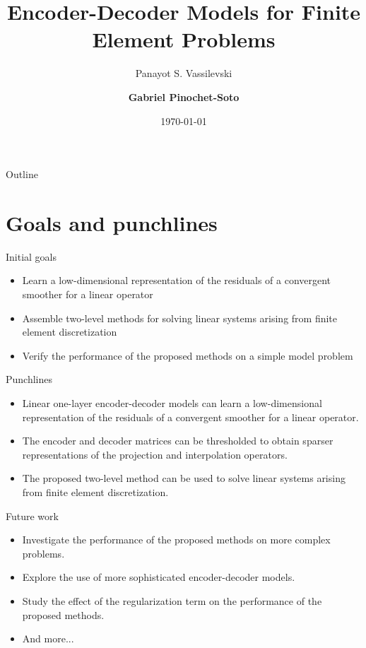 \documentclass{beamer}
\title[EDNN for FEM]{Encoder-Decoder Models for Finite Element Problems}
\author[P. S. Vassilevski, G. Pinochet-Soto]{%
    Panayot S. Vassilevski\inst{1} \and
    \textbf{Gabriel Pinochet-Soto}\inst{1}
}
\institute[PSU]{
    \inst{1} Portland State University
}
\date{\today}
\begin{document}
\begin{frame}
\titlepage
\end{frame}

\begin{frame}{Outline}
\tableofcontents
\end{frame}

\section{Goals and punchlines}
\begin{frame}{Initial goals}
\begin{itemize}
    \item Learn a low-dimensional representation of the residuals of a convergent smoother for a linear operator
    \item Assemble two-level methods for solving linear systems arising from finite element discretization
    \item Verify the performance of the proposed methods on a simple model problem
\end{itemize}
\end{frame}

\begin{frame}{Punchlines}
\begin{itemize}
    \item Linear one-layer encoder-decoder models can learn a low-dimensional representation of the residuals of a convergent smoother for a linear operator.
    \item The encoder and decoder matrices can be thresholded to obtain sparser representations of the projection and interpolation operators.
    \item The proposed two-level method can be used to solve linear systems arising from finite element discretization.
\end{itemize}
\end{frame}

\begin{frame}{Future work}
\begin{itemize}
    \item Investigate the performance of the proposed methods on more complex problems.
    \item Explore the use of more sophisticated encoder-decoder models.
    \item Study the effect of the regularization term on the performance of the proposed methods.
    \item And more...
\end{itemize}
\end{frame}
\end{document}
